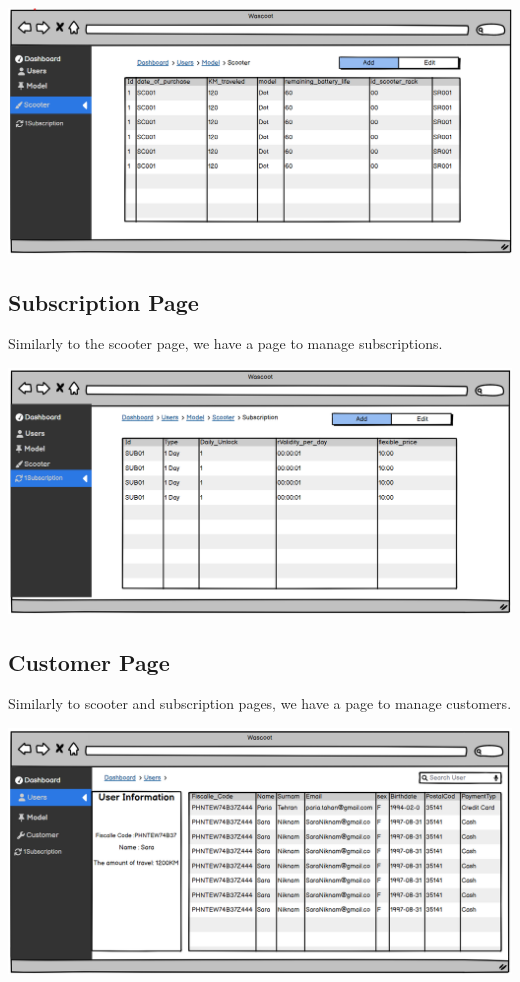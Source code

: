 \includegraphics[scale = 0.6]{sections/DLL/Scooter.png}

\subsection{Subscription Page}

Similarly to the scooter page, we have a page to manage subscriptions.

\includegraphics[scale = 0.6]{sections/DLL/subScription.png}

\subsection{Customer Page}

Similarly to scooter and subscription pages, we have a page to manage customers.

\includegraphics[scale = 0.6]{sections/DLL/Users.png}